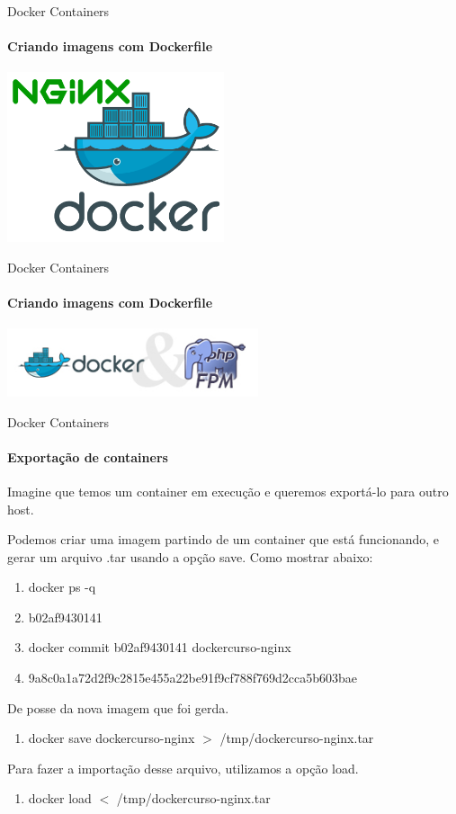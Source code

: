 \documentclass{beamer}
\begin{document}
\begin{frame}{Docker Containers}
    \framesubtitle{Criando imagens com Dockerfile}
    \href{https://github.com/agnaldom/curso-docker/blob/master/images/nginx/Dockerfile}{\includegraphics[height=5cm]{img/docker-nginx.png}}
\end{frame}
\begin{frame}{Docker Containers}
    \framesubtitle{Criando imagens com Dockerfile}
    \includegraphics[height=2cm]{img/docker-php.png}
\end{frame}

\begin{frame}{Docker Containers}
    \framesubtitle{Exporta\c{c}\~ao de containers}
    Imagine que temos um container em execu\c{c}\~ao e queremos export\'a-lo para outro host.

    Podemos criar uma imagem partindo de um container que está funcionando, e gerar um arquivo .tar usando a op\c{c}\~ao save. Como mostrar abaixo:
    \begin{enumerate}
        \item docker ps -q
        \item b02af9430141
        \item docker commit b02af9430141  dockercurso-nginx
        \item 9a8c0a1a72d2f9c2815e455a22be91f9cf788f769d2cca5b603bae
    \end{enumerate}
    De posse da nova imagem que foi gerda.
    \begin{enumerate}
        \item docker save dockercurso-nginx $>$ /tmp/dockercurso-nginx.tar
    \end{enumerate}
    Para fazer a importa\c{c}\~ao desse arquivo, utilizamos a op\c{c}\~ao load.
    \begin{enumerate}
        \item docker load $<$ /tmp/dockercurso-nginx.tar
    \end{enumerate}
\end{frame}
\end{document}
